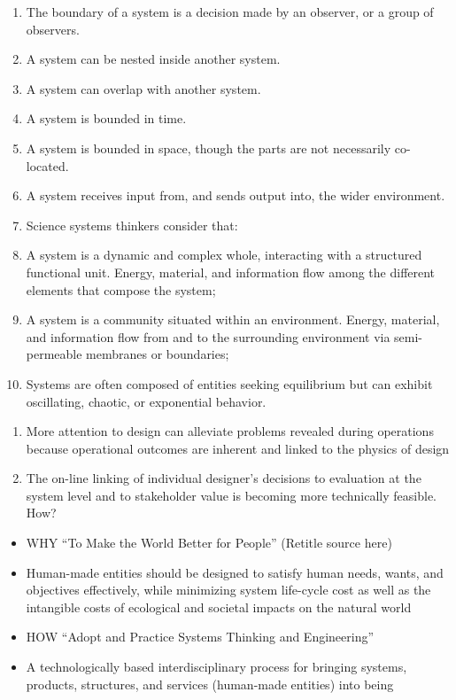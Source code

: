 \begin{enumerate}
	\item The boundary of a system is a decision made by an observer, or a group of observers.
	\item A system can be nested inside another system.
	\item A system can overlap with another system.
	\item A system is bounded in time.
	\item A system is bounded in space, though the parts are not necessarily co-located.
	\item A system receives input from, and sends output into, the wider environment.
	\item Science systems thinkers consider that:
	\item A system is a dynamic and complex whole, interacting with a structured functional unit. Energy, material, and information flow among the different elements that compose the system;
	\item A system is a community situated within an environment. Energy, material, and information flow from and to the surrounding environment via semi-permeable membranes or boundaries;
	\item Systems are often composed of entities seeking equilibrium but can exhibit oscillating, chaotic, or exponential behavior.
\end{enumerate}

\begin{enumerate}
	\item More attention to design can alleviate problems revealed during operations because operational outcomes are inherent and linked to the physics of design
	\item The on-line linking of individual designer’s decisions to evaluation at the system level and to stakeholder value is becoming more technically feasible. How?
\end{enumerate}

\begin{itemize}
	\item WHY “To Make the World Better for People” (Retitle source here)
	\item Human-made entities should be designed to satisfy human needs, wants, and objectives effectively, while minimizing system life-cycle cost as well as the intangible costs of ecological and societal impacts on the natural world
	\item HOW ``Adopt and Practice Systems Thinking and Engineering''
	\item A technologically based interdisciplinary process for bringing systems, products, structures, and services (human-made entities) into being
\end{itemize}

